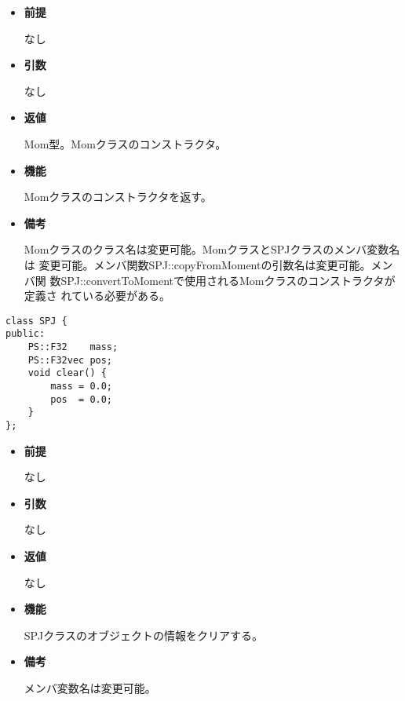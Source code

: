 \begin{itemize}

\item {\bf 前提}

  なし
  
\item {\bf 引数}

  なし

\item {\bf 返値}

  Mom型。Momクラスのコンストラクタ。
  
\item {\bf 機能}

  Momクラスのコンストラクタを返す。

\item {\bf 備考}

  Momクラスのクラス名は変更可能。MomクラスとSPJクラスのメンバ変数名は
  変更可能。メンバ関数SPJ::copyFromMomentの引数名は変更可能。メンバ関
  数SPJ::convertToMomentで使用されるMomクラスのコンストラクタが定義さ
  れている必要がある。

\end{itemize}


\begin{screen}
\begin{verbatim}
class SPJ {
public:
    PS::F32    mass;
    PS::F32vec pos;
    void clear() {
        mass = 0.0;
        pos  = 0.0;
    }
};
\end{verbatim}
\end{screen}

\begin{itemize}

\item {\bf 前提}

  なし
  
\item {\bf 引数}

  なし

\item {\bf 返値}

  なし
  
\item {\bf 機能}

  SPJクラスのオブジェクトの情報をクリアする。

\item {\bf 備考}

  メンバ変数名は変更可能。

\end{itemize}

